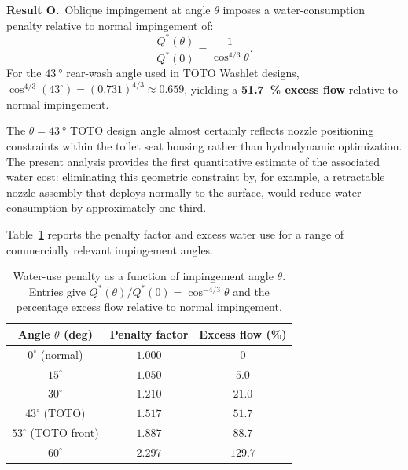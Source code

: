 \documentclass[aps,prfluids,reprint,amsmath,amssymb,floatfix]{revtex4-2}
\begin{document}
\begin{mdframed}[style=resultbox]
\textbf{Result O.}\ Oblique impingement at angle $\theta$ imposes a
water-consumption penalty relative to normal impingement of:
\begin{equation}
  \frac{Q^*(\theta)}{Q^*(0)} = \frac{1}{\cos^{4/3}\theta}.
  \label{eq:Qpenalty}
\end{equation}
For the $\SI{43}{\degree}$ rear-wash angle used in TOTO Washlet designs,
$\cos^{4/3}(43^\circ) = (0.731)^{4/3} \approx 0.659$, yielding a
\textbf{\SI{51.7}{\percent} excess flow} relative to normal impingement.
\end{mdframed}

The $\theta = \SI{43}{\degree}$ TOTO design angle almost certainly reflects
nozzle positioning constraints within the toilet seat housing rather than
hydrodynamic optimization. The present analysis provides the first
quantitative estimate of the associated water cost: eliminating this
geometric constraint by, for example, a retractable nozzle assembly that
deploys normally to the surface, would reduce water consumption by
approximately one-third.

Table~\ref{tab:oblique} reports the penalty factor and excess water use
for a range of commercially relevant impingement angles.

\begin{table}[H]
\centering
\caption{Water-use penalty as a function of impingement angle $\theta$.
Entries give $Q^*(\theta)/Q^*(0) = \cos^{-4/3}\theta$ and the percentage
excess flow relative to normal impingement.}
\label{tab:oblique}
\renewcommand{\arraystretch}{1.3}
\begin{tabular}{ccc}
\toprule
\textbf{Angle $\theta$ (deg)} & \textbf{Penalty factor} & \textbf{Excess flow (\%)} \\
\midrule
$0^\circ$  (normal)  & $1.000$ & $0$     \\
$15^\circ$           & $1.050$ & $5.0$   \\
$30^\circ$           & $1.210$ & $21.0$  \\
$43^\circ$  (TOTO)  & $1.517$ & $51.7$  \\
$53^\circ$  (TOTO front) & $1.887$ & $88.7$ \\
$60^\circ$           & $2.297$ & $129.7$ \\
\bottomrule
\end{tabular}
\end{table}

\end{document}
